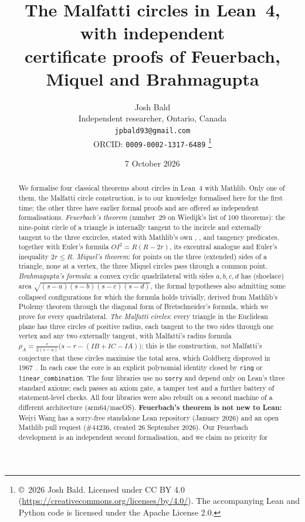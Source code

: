 \documentclass[11pt]{article}
\title{The Malfatti circles in Lean~4, with independent\\
certificate proofs of Feuerbach, Miquel and Brahmagupta}
\author{Josh Bald\\ \small Independent researcher, Ontario, Canada\\ \small\texttt{jpbald93@gmail.com}\\
\small ORCID: \texttt{0009-0002-1317-6489}
\thanks{\copyright~2026 Josh Bald. Licensed under CC BY 4.0 (\url{https://creativecommons.org/licenses/by/4.0/}). The accompanying Lean and Python code is licensed under the Apache License 2.0.}}
\date{7 October 2026}
\theoremstyle{definition}
\theoremstyle{remark}
\newcommand{\lean}[1]{\texttt{#1}}
\begin{document}
\sloppy
\maketitle

\begin{abstract}
We formalise four classical theorems about circles in Lean~4 with Mathlib. Only one of them,
the Malfatti circle construction, is to our knowledge formalised here for the first time; the other
three have earlier formal proofs and are offered as independent formalisations. \emph{Feuerbach's
theorem} (number~29 on Wiedijk's list of 100 theorems): the nine-point circle of a triangle is
internally tangent to the incircle and externally tangent to the three excircles, stated with
Mathlib's own , ,
 and tangency predicates, together with Euler's formula
$OI^2=R(R-2r)$, its excentral analogue and Euler's inequality $2r\le R$. \emph{Miquel's theorem}:
for points on the three (extended) sides of a triangle, none at a vertex, the three Miquel circles
pass through a common point. \emph{Brahmagupta's formula}: a convex cyclic quadrilateral with
sides $a,b,c,d$ has (shoelace) area $\sqrt{(s-a)(s-b)(s-c)(s-d)}$, the formal hypotheses also
admitting some collapsed configurations for which the formula holds trivially, derived from Mathlib's Ptolemy theorem
through the diagonal form of Bretschneider's formula, which we prove for every quadrilateral.
\emph{The Malfatti circles}: every triangle in the Euclidean plane has three circles of positive
radius, each tangent to the two sides through one vertex and any two externally tangent, with
Malfatti's radius formula $\rho_A=\frac{r}{2(s-a)}\bigl(s-r-(IB+IC-IA)\bigr)$; this is the
construction, \emph{not} Malfatti's conjecture that these circles maximise the total area, which
Goldberg disproved in 1967~\cite{Goldberg}.
In each case the core is an explicit polynomial identity closed by \lean{ring} or
\lean{linear\_combination}. The four libraries use no \lean{sorry} and depend only on Lean's three
standard axioms; each passes an axiom gate, a tamper test and a further battery of statement-level
checks. All four libraries were also rebuilt on a second machine of a different architecture
(arm64/macOS).
\textbf{Feuerbach's theorem is not new to Lean:} Weiyi Wang has a sorry-free standalone Lean
repository (January 2026) and an open Mathlib pull request (\#44236, created 26 September 2026).
Our Feuerbach development is an independent second formalisation, and we claim no priority for

\end{abstract}
\end{document}
